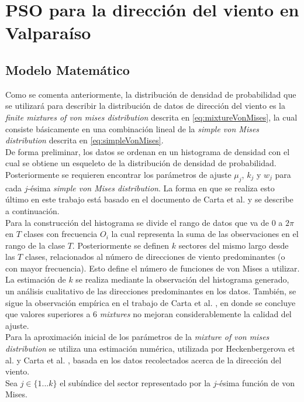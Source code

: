 
\chapter{PSO para la dirección del viento en Valparaíso}
\section{Modelo Matemático}\label{ss:model_math_dir} 
Como se comenta anteriormente, la distribución de densidad de probabilidad que se utilizará para describir la distribución de datos de dirección del viento
es la \emph{finite mixtures of von mises distribution} descrita en \ref{eq:mixtureVonMises}, la cual consiste básicamente en una combinación lineal de la \emph{simple von Mises distribution} descrita en \ref{eq:simpleVonMises}.\\ 
De forma preliminar, los datos se ordenan en un histograma de densidad con el cual se obtiene un esqueleto de la distribución de densidad de probabilidad. Posteriormente se requieren encontrar los parámetros de ajuste $\mu_j$, $k_j$ y $w_j$ para cada $j$-ésima \emph{simple von Mises distribution}. La forma en que
se realiza esto último en este trabajo está basado en el documento de Carta et al. \cite{Carta07} y se describe a continuación.\\
Para la construcción del histograma se divide el rango de datos que va de 0 a $2\pi$ en $T$ clases con frecuencia $O_i$ la cual representa la suma de las observaciones en el rango de la clase $T$. Posteriormente se definen $k$ sectores del mismo largo desde las $T$ clases, relacionados al número de direcciones de viento predominantes (o con mayor frecuencia). Esto define el número de funciones de von Mises a utilizar. La estimación de $k$ se realiza mediante la observación del histograma generado, un análisis cualitativo de las direcciones predominantes en los datos. También, se sigue la observación empírica en el trabajo de Carta et al. \cite{Carta07}, en donde se concluye que valores superiores a 6 \emph{mixtures} no mejoran considerablemente la calidad del ajuste.\\
Para la aproximación inicial de los parámetros de la \emph{mixture of von mises distribution} se utiliza una estimación numérica, utilizada por Heckenbergerova et al. \cite{Heckenbergerova15} \cite{Heckenbergerova13} y Carta et al. \cite{Carta07}, basada en los datos recolectados acerca de la dirección del viento.\\
Sea $j \in \{1 ... k\}$ el subíndice del sector representado por la $j$-ésima función de von Mises.\\

